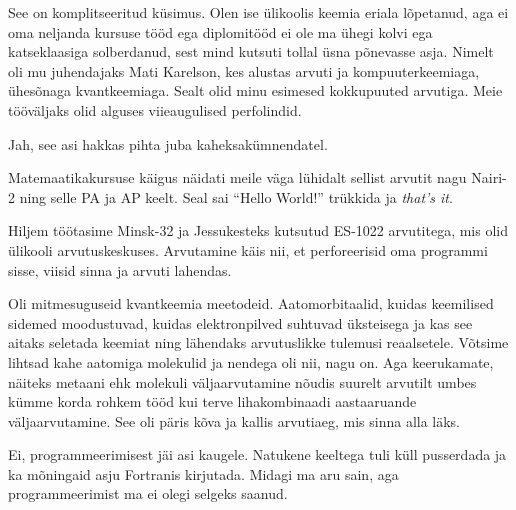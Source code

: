 \label{chptr:lucifer}


See on komplitseeritud küsimus. Olen ise ülikoolis keemia eriala lõpetanud, aga ei oma neljanda kursuse tööd ega 
diplomitööd ei ole ma ühegi kolvi ega katseklaasiga solberdanud, sest mind 
kutsuti tollal üsna põnevasse asja. Nimelt oli mu juhendajaks Mati 
Karelson, kes alustas arvuti ja kompuuterkeemiaga, 
ühesõnaga kvantkeemiaga. Sealt olid minu esimesed kokkupuuted arvutiga. Meie 
tööväljaks olid alguses viieaugulised perfolindid. 


Jah, see asi hakkas pihta juba kaheksakümnendatel.


Matemaatikakursuse käigus näidati meile väga lühidalt sellist arvutit 
nagu Nairi-2 ning selle PA ja AP keelt. Seal sai \enquote{Hello World!} trükkida ja 
\emph{that's it}. 

Hiljem töötasime 
Minsk-32 ja Jessukesteks kutsutud ES-1022 arvutitega, mis olid ülikooli 
arvutuskeskuses. Arvutamine käis nii, et perforeerisid oma programmi sisse, 
viisid sinna ja arvuti lahendas. 


Oli mitmesuguseid kvantkeemia meetodeid. Aatomorbitaalid, kuidas 
keemilised sidemed moodustuvad, kuidas elektronpilved suhtuvad üksteisega ja 
kas see aitaks seletada keemiat ning lähendaks arvutuslikke tulemusi 
reaalsetele. Võtsime lihtsad kahe aatomiga 
molekulid ja nendega oli nii, nagu on. Aga keerukamate, näiteks metaani 
ehk  molekuli väljaarvutamine nõudis suurelt arvutilt umbes kümme 
korda rohkem tööd kui terve lihakombinaadi aastaaruande väljaarvutamine. See 
oli päris kõva ja kallis arvutiaeg, mis sinna alla läks.


Ei, programmeerimisest jäi asi kaugele. Natukene keeltega tuli küll
pusserdada ja ka mõningaid asju Fortranis 
kirjutada. Midagi ma aru sain, aga programmeerimist ma ei 
olegi selgeks saanud. 

